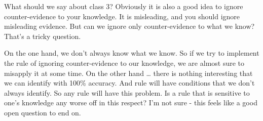 \documentclass[
]{article}
\begin{document}
What should we say about class 3? Obviously it is also a good idea to
ignore counter-evidence to your knowledge. It is misleading, and you
should ignore misleading evidence. But can we ignore only
counter-evidence to what we know? That's a tricky question.

On the one hand, we don't always know what we know. So if we try to
implement the rule of ignoring counter-evidence to our knowledge, we are
almost sure to misapply it at some time. On the other hand \ldots{}
there is nothing interesting that we can identify with 100\% accuracy.
And rule will have conditions that we don't always identify. So any rule
will have this problem. Is a rule that is sensitive to one's knowledge
any worse off in this respect? I'm not sure - this feels like a good
open question to end on.
\end{document}
